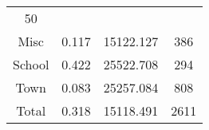 \documentclass[]{book}
\theoremstyle{definition}
\theoremstyle{definition}
\theoremstyle{definition}
\theoremstyle{remark}
\begin{document}
\begin{longtable}[]{@{}cccc@{}}
\begin{minipage}[t]{0.15\columnwidth}
50\strut
\end{minipage}\tabularnewline
\begin{minipage}[t]{0.12\columnwidth}\centering\strut
Misc\strut
\end{minipage} & \begin{minipage}[t]{0.11\columnwidth}\centering\strut
0.117\strut
\end{minipage} & \begin{minipage}[t]{0.15\columnwidth}\centering\strut
15122.127\strut
\end{minipage} & \begin{minipage}[t]{0.15\columnwidth}\centering\strut
386\strut
\end{minipage}\tabularnewline
\begin{minipage}[t]{0.12\columnwidth}\centering\strut
School\strut
\end{minipage} & \begin{minipage}[t]{0.11\columnwidth}\centering\strut
0.422\strut
\end{minipage} & \begin{minipage}[t]{0.15\columnwidth}\centering\strut
25522.708\strut
\end{minipage} & \begin{minipage}[t]{0.15\columnwidth}\centering\strut
294\strut
\end{minipage}\tabularnewline
\begin{minipage}[t]{0.12\columnwidth}\centering\strut
Town\strut
\end{minipage} & \begin{minipage}[t]{0.11\columnwidth}\centering\strut
0.083\strut
\end{minipage} & \begin{minipage}[t]{0.15\columnwidth}\centering\strut
25257.084\strut
\end{minipage} & \begin{minipage}[t]{0.15\columnwidth}\centering\strut
808\strut
\end{minipage}\tabularnewline
\begin{minipage}[t]{0.12\columnwidth}\centering\strut
Total\strut
\end{minipage} & \begin{minipage}[t]{0.11\columnwidth}\centering\strut
0.318\strut
\end{minipage} & \begin{minipage}[t]{0.15\columnwidth}\centering\strut
15118.491\strut
\end{minipage} & \begin{minipage}[t]{0.15\columnwidth}\centering\strut
2611\strut
\end{minipage}\tabularnewline
\bottomrule
\end{longtable}
\end{document}
